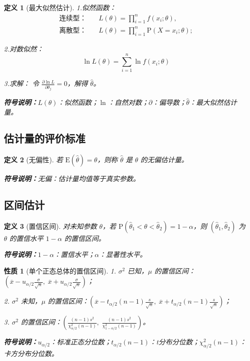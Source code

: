 \documentclass[11pt,a4paper,oneside]{article}
\theoremstyle{yhbthm}
\newtheorem{definition}{定义}[section]
\newtheorem{property}{性质}[section]
\newcommand{\E}{\mathrm{E}}
\newcommand{\Prob}{\mathrm{P}}
\newcommand{\samplemean}[1]{\overline{#1}}
\newcommand{\symnote}[1]{\par\noindent\textbf{符号说明：}#1\par}
\newcommand{\ualpha}{u_{\alpha/2}}
\newcommand{\talpha}[1]{t_{\alpha/2}(#1)}
\newcommand{\xalpha}[1]{\chi^2_{\alpha/2}(#1)}
\newcommand{\xalphaone}[1]{\chi^2_{1-\alpha/2}(#1)}
\begin{document}
\begin{definition}[最大似然估计]


\item 1.似然函数：
\[
\begin{split}
\text{连续型：} &\quad L(\theta) = \prod_{i=1}^{n} f(x_i;\theta), \\
\text{离散型：} &\quad L(\theta) = \prod_{i=1}^{n} \Prob(X = x_i;\theta);
\end{split}
\]

\item 2.对数似然：
$$
\ln L(\theta) = \sum_{i=1}^{n} \ln f(x_i;\theta)
$$

\item 3.求解：
令 $\frac{\partial \ln L}{\partial \theta_j} = 0$，解得 $\hat{\theta}$。

\symnote{$L(\theta)$：似然函数；$\ln$：自然对数；$\partial$：偏导数；$\hat{\theta}$：最大似然估计量。}
\end{definition}

\subsection{估计量的评价标准}
\begin{definition}[无偏性]
若 $\E(\hat{\theta}) = \theta$，则称 $\hat{\theta}$ 是 $\theta$ 的无偏估计量。
\symnote{无偏：估计量均值等于真实参数。}
\end{definition}

\subsection{区间估计}
\begin{definition}[置信区间]
对未知参数 $\theta$，若 $\Prob(\hat{\theta}_1<\theta<\hat{\theta}_2)=1-\alpha$，则 $(\hat{\theta}_1,\hat{\theta}_2)$ 为 $\theta$ 的置信水平 $1-\alpha$ 的置信区间。
\symnote{$1-\alpha$：置信水平；$\alpha$：显著性水平。}
\end{definition}

\begin{property}[单个正态总体的置信区间]
1. $\sigma^2$ 已知，$\mu$ 的置信区间：$\left( \samplemean{x}-\ualpha \frac{\sigma}{\sqrt{n}},\; \samplemean{x}+\ualpha \frac{\sigma}{\sqrt{n}} \right)$；

2. $\sigma^2$ 未知，$\mu$ 的置信区间：$\left( \samplemean{x}-\talpha{n-1}\frac{s}{\sqrt{n}},\; \samplemean{x}+\talpha{n-1}\frac{s}{\sqrt{n}} \right)$；

3. $\sigma^2$ 的置信区间：$\left( \frac{(n-1)s^2}{\xalpha{n-1}},\; \frac{(n-1)s^2}{\xalphaone{n-1}} \right)$。
\symnote{$\ualpha$：标准正态分位数；$\talpha{n-1}$：t分布分位数；$\xalpha{n-1}$：卡方分布分位数。}
\end{property}
\end{document}

